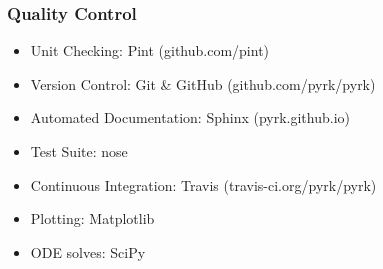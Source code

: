 \begin{frame}[fragile]
  \frametitle{Quality Control}
  \begin{itemize}
    \item Unit Checking: Pint (github.com/pint)
    \item Version Control: Git & GitHub (github.com/pyrk/pyrk)
    \item Automated Documentation: Sphinx (pyrk.github.io)
    \item Test Suite: nose
    \item Continuous Integration: Travis (travis-ci.org/pyrk/pyrk)
    \item Plotting: Matplotlib
    \item ODE solves: SciPy
  \end{itemize}
\end{frame}

